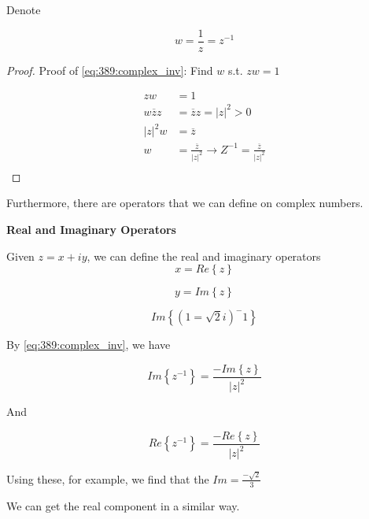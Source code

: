 \documentclass[10pt]{article}
\begin{document}
\begin{definition}
	Denote 

	\begin{equation}
		w = \frac{1}{z} = z^{-1}
		\label{eq:389:complex_inv}
	\end{equation}

	\begin{proof}
		Proof of \eqref{eq:389:complex_inv}:
		Find $ w $ s.t. $ zw = 1 $ 

		\begin{equation}
			\begin{split}
				zw &=1  \\
				 w \overline{z} z&= \overline{z}z = |z|^2 > 0  \\
				 |z|^2 w &= \overline{z}  \\
				 w &= \frac{\overline{z}}{|z|^2} \rightarrow Z^{-1} = \frac{\overline{z}}{|z|^2}\\
			\end{split}
		\end{equation}
		
	\end{proof}

\end{definition}

Furthermore, there are operators that we can define on complex numbers.

\begin{definition}
	\textbf{Real and Imaginary Operators}

	Given $ z = x + iy $, we can define the real and imaginary operators
	\begin{equation}
		x = Re \left\{ z \right\}
	\end{equation}

	\begin{equation}
		y = Im \left\{ z \right\}
	\end{equation}

	\begin{example}
		\begin{equation}
			Im \left\{ (1 = \sqrt{2} i)^-1 \right\} 
		\end{equation}

		By \eqref{eq:389:complex_inv}, we have 

		\begin{equation}
			Im \left\{ z^{-1} \right\} = \frac{-Im \left\{ z \right\} }{|z|^2} 
			\label{eq:389:complex_inv_im}
		\end{equation}

		And

		\begin{equation}
			Re \left\{ z^{-1} \right\} = \frac{-Re \left\{ z \right\} }{|z|^2} 
			\label{eq:389:complex_inv_re}
		\end{equation}

		Using these, for example, we find that the $ Im = \frac{-\sqrt{2} }{3} $

		We can get the real component in a similar way.
		
	\end{example}

\end{definition}
\end{document}
